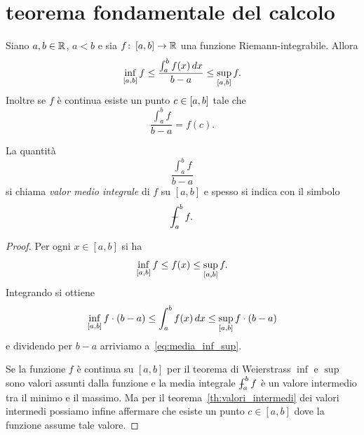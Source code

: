\section{teorema fondamentale del calcolo}

\begin{theorem}%
  \label{th:media_integrale}%
  \mymark{***}%
  Siano $a,b\in {\mathbb R}$, $a<b$ e sia
  $f\colon \left[a,b\right] \to {\mathbb R}$ una funzione Riemann-integrabile.
  Allora
  \begin{equation}\label{eq:media_inf_sup}
    \inf_{\left[a,b\right]} f 
    \le \frac{\int_a^b f(x)\, dx}{b-a} 
    \le \sup_{\left[a,b\right]} f.
  \end{equation}
  Inoltre se $f$ è continua 
  esiste un punto $c \in \left[a,b\right]$
  tale che
  \[
  \frac{\int_a^b f}{b-a} = f(c).
  \]
  \end{theorem}
  La quantità
  \[
    \frac{\int_a^b f}{b-a}
  \]
  si chiama \emph{valor medio integrale} di $f$ su $[a,b]$ e spesso
  si indica con il simbolo
  \[
    \dashint_a^b f.
  \]
  \begin{proof}
  \mymark{***}
  Per ogni $x\in [a,b]$ si ha 
  \[
    \inf_{\left[a,b\right]} f \le f(x) \le \sup_{\left[a,b\right]}f.
  \]
  Integrando si ottiene
  \[
    \inf_{\left[a,b\right]} f \cdot (b-a)
    \le \int_a^b f(x)\, dx 
    \le \sup_{\left[a,b\right]}f\cdot (b-a)
  \]
  e dividendo per $b-a$ arriviamo a~\eqref{eq:media_inf_sup}.

  Se la funzione $f$ è continua su $[a,b]$ per il teorema di Weierstrass 
  $\inf$ e $\sup$ sono valori assunti dalla funzione 
  e la media integrale $\dashint_a^b f$ è un valore intermedio tra il 
  minimo e il massimo.
  Ma per il teorema~\ref{th:valori_intermedi} dei valori intermedi 
  possiamo infine affermare che esiste un punto $c\in [a,b]$
  dove la funzione assume tale valore.
\end{proof}
  

